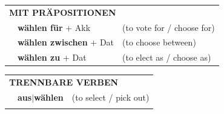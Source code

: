 \documentclass[10pt,a4paper]{revtex4-2}
\begin{document}
\begin{verbbox-acc}
 \vspace{10pt}

\begin{tabular}{lll}
      \multicolumn{3}{l}{\textbf{MIT PRÄPOSITIONEN}}\\
& \textbf{wählen für} + Akk & (to vote for / choose for)\\
& \textbf{wählen zwischen} + Dat & (to choose between)\\
& \textbf{wählen zu} + Dat & (to elect as / choose as)\\
\end{tabular}
  \hfill
\begin{tabular}{lll}
      \multicolumn{3}{l}{\textbf{TRENNBARE VERBEN}}\\
 & \textbf{aus$|$wählen} & (to select / pick out)\\
\vspace{20pt}
  \end{tabular}
  
  \vspace{-5pt}

\end{verbbox-acc}
\end{document}
